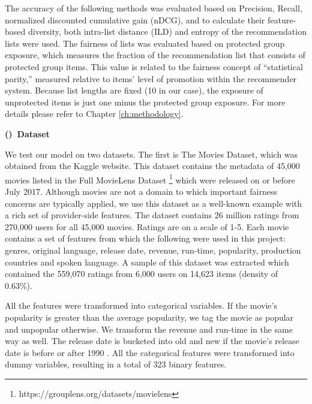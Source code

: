 The accuracy of the following methods was evaluated based on Precision, Recall, normalized discounted cumulative gain (nDCG), and to calculate their feature-based diversity, both intra-list distance (ILD) and entropy of the recommendation lists were used. The fairness of lists was evaluated based on protected group exposure, which measures the fraction of the recommendation list that consists of protected group items. This value is related to the fairness concept of ``statistical parity,'' measured relative to items' level of promotion within the recommender system. Because list lengths are fixed (10 in our case), the exposure of unprotected items is just one minus the protected group exposure. For more details please refer to Chapter \ref{ch:methodology}.

\vspace{0.25cm}
\noindent \textbf{()~Dataset}
\vspace{0.25cm}

We test our model on two datasets. The first is The Movies Dataset, which was obtained from the Kaggle website. This dataset contains the metadata of 45,000 movies listed in the Full MovieLens Dataset \footnote{https://grouplens.org/datasets/movielens} which were released on or before July 2017. Although movies are not a domain to which important fairness concerns are typically applied, we use this dataset as a well-known example with a rich set of provider-side features. The dataset contains 26 million ratings from 270,000 users for all 45,000 movies. Ratings are on a scale of 1-5. Each movie contains a set of features from which the following were used in this project: genres, original language, release date, revenue, run-time, popularity, production countries and spoken language. A sample of this dataset was extracted which contained the 559,070 ratings from 6,000 users on 14,623 items (density of 0.63\%).

All the features were transformed into categorical variables. If the movie's popularity is greater than the average popularity, we tag the movie as popular and unpopular otherwise. We transform the revenue and run-time in the same way as well. The release date is bucketed into old and new if the movie's release date is before or after 1990 \cite{kamishima2016model}. All the categorical features were transformed into dummy variables, resulting in a total of 323 binary features.

